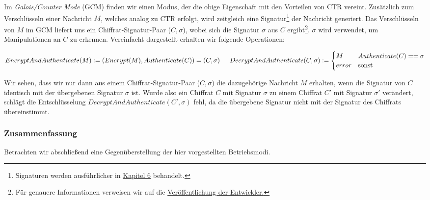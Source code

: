 Im \textit{Galois/Counter Mode} (GCM) finden wir einen Modus, der die obige Eigenschaft mit den Vorteilen von CTR vereint. Zusätzlich zum Verschlüsseln einer Nachricht \(M\), welches analog zu CTR erfolgt, wird zeitgleich eine Signatur\footnote{Signaturen werden ausführlicher in \hyperref[cha6]{Kapitel 6} behandelt.} der Nachricht generiert. Das Verschlüsseln von \(M\) im GCM liefert uns ein Chiffrat-Signatur-Paar (\(C, \sigma\)), wobei sich die Signatur \(\sigma\) aus \(C\) ergibt\footnote{Für genauere Informationen verweisen wir auf die \href{http://csrc.nist.gov/groups/ST/toolkit/BCM/documents/proposedmodes/gcm/gcm-spec.pdf}{Veröffentlichung der Entwickler.}}. \(\sigma\) wird verwendet, um Manipulationen an \(C\) zu erkennen.
Vereinfacht dargestellt erhalten wir folgende Operationen:
\bigskip

\begin{math}
	EncryptAndAuthenticate(M) := (Encrypt(M), Authenticate(C)) = (C, \sigma) \\
	\\
	\indent DecryptAndAuthenticate(C, \sigma) := \begin{cases}
		M           & Authenticate(C) == \sigma\\
		error       & \text{sonst}
	\end{cases}
\end{math}
\bigskip

Wir sehen, dass wir nur dann aus einem Chiffrat-Signatur-Paar (\(C, \sigma\)) die dazugehörige Nachricht \(M\) erhalten, wenn die Signatur von \(C\) identisch mit der übergebenen Signatur \(\sigma\) ist. Wurde also ein Chiffrat \(C\) mit Signatur \(\sigma\) zu einem Chiffrat \(C'\) mit Signatur \(\sigma'\) verändert, schlägt die Entschlüsselung \(DecryptAndAuthenticate(C', \sigma)\) fehl, da die übergebene Signatur nicht mit der Signatur des Chiffrats übereinstimmt.

\subsubsection{Zusammenfassung}
Betrachten wir abschließend eine Gegenüberstellung der hier vorgestellten Betriebsmodi.
\newpage

\captionsetup[table]{labelformat=empty}
\captionsetup[table]{singlelinecheck=false}
\captionsetup{font=footnotesize}

